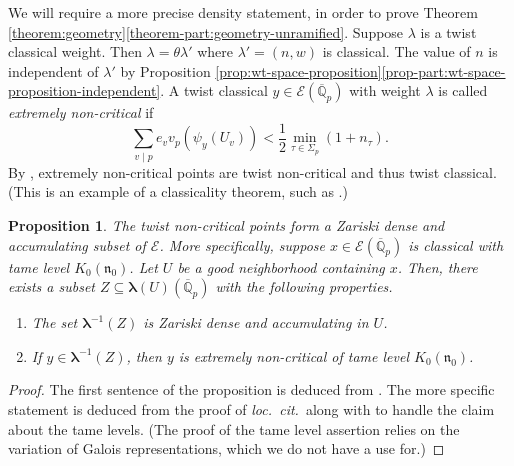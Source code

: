 \documentclass[10pt, twoside]{amsart}
\theoremstyle{plain}
\newtheorem{proposition}[theorem]{Proposition}
\theoremstyle{definition}
\theoremstyle{remark}
\numberwithin{equation}{subsection}
\def\gn{\mathfrak n}
\def\scre{\mathscr E}
\def\qpbar{\overline{\mathbb Q}_p}
\begin{document}
We will require a more precise density statement, in order to prove Theorem \ref{theorem:geometry}\ref{theorem-part:geometry-unramified}. Suppose $\lambda$ is a twist classical weight. Then $\lambda = \theta \lambda'$ where $\lambda' = (n,w)$ is classical. The value of $n$ is independent of $\lambda'$ by Proposition \ref{prop:wt-space-proposition}\ref{prop-part:wt-space-proposition-independent}. A twist classical $y \in \scre(\qpbar)$ with weight $\lambda$ is called {\em extremely non-critical} if 
\begin{equation*}
\sum_{v \mid p} e_v v_p(\psi_y(U_v)) < \frac{1}{2}\min_{\tau \in \Sigma_p} (1 + n_\tau).
\end{equation*}
By \cite[Proposition 6.3.8]{BH}, extremely non-critical points are twist non-critical and thus twist classical. (This is an example of a classicality theorem, such as \cite[Theorem 3.2.5]{Hansen}.)

\begin{proposition}\label{prop:density}
The twist non-critical points form a Zariski dense and accumulating subset of $\mathscr E$. More specifically, suppose $x \in \scre(\qpbar)$ is classical with tame level $K_0(\gn_0)$. Let $U$ be a good neighborhood containing $x$. Then, there exists a subset $Z \subseteq { \boldsymbol{\lambda}}(U)(\qpbar)$ with the following properties.
\begin{enumerate}[label=(\roman*)]
\item The set ${ \boldsymbol{\lambda}}^{-1}(Z)$ is Zariski dense and accumulating in $U$.\label{prop-part:density-dense}
\item If $y \in { \boldsymbol{\lambda}}^{-1}(Z)$, then $y$ is extremely non-critical of tame level $K_0(\gn_0)$.\label{prop-part:density-levels}
\end{enumerate}
\end{proposition}
\begin{proof}
The first sentence of the proposition is deduced from \cite[Proposition 6.4.7(4)]{BH}. The more specific statement is deduced from the proof of {\em loc.\ cit.}\ along with  \cite[Lemma 6.5.7]{BH} to handle the claim about the tame levels. (The proof of the tame level assertion relies on the variation of Galois representations, which we do not have a use for.) 
\end{proof}
\end{document}
